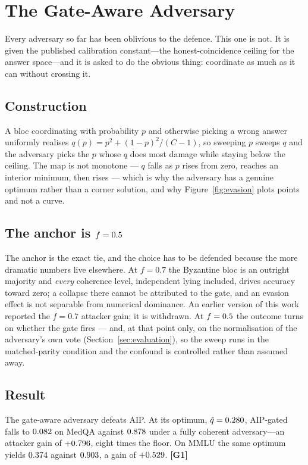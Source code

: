 \section{The Gate-Aware Adversary}
\label{sec:gateaware}

Every adversary so far has been oblivious to the defence. This one is not. It is
given the published calibration constant---the honest-coincidence ceiling for the
answer space---and it is asked to do the obvious thing: coordinate as much as it
can without crossing it.

\subsection{Construction}

A bloc coordinating with probability $p$ and otherwise picking a wrong answer
uniformly realises $q(p) = p^2 + (1-p)^2/(C-1)$, so sweeping $p$ sweeps $q$ and
the adversary picks the $p$ whose $q$ does most damage while staying below the
ceiling. The map is not monotone --- $q$ falls as $p$ rises from zero, reaches an
interior minimum, then rises --- which is why the adversary has a genuine optimum
rather than a corner solution, and why Figure~\ref{fig:evasion} plots points and
not a curve.

\subsection{The anchor is $f = 0.5$}

The anchor is the exact tie, and the choice has to be defended because the more
dramatic numbers live elsewhere. At $f=0.7$ the Byzantine bloc is an outright
majority and \emph{every} coherence level, independent lying included, drives
accuracy toward zero; a collapse there cannot be attributed to the gate, and an
evasion effect is not separable from numerical dominance. An earlier version of
this work reported the $f=0.7$ attacker gain; it is withdrawn. At
$f=0.5$ the outcome turns on whether the gate fires --- and, at
that point only, on the normalisation of the adversary's own vote
(Section~\ref{sec:evaluation}), so the sweep runs in the matched-parity condition
and the confound is controlled rather than assumed away.

\subsection{Result}

The gate-aware adversary defeats AIP. At its optimum, $\hat q =
0.280$, AIP-gated falls to $0.082$ on MedQA against
$0.878$ under a fully coherent adversary---an attacker gain of
$+0.796$, eight times the floor. On MMLU the same optimum yields
$0.374$ against $0.903$, a gain of
$+0.529$. \textbf{[G1]}

